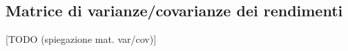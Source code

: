 \documentclass{article}
\begin{document}
\pagebreak

\subsection{Matrice di varianze/covarianze dei rendimenti}

[TODO (spiegazione mat. var/cov)]



\nocite{*}
\end{document}
